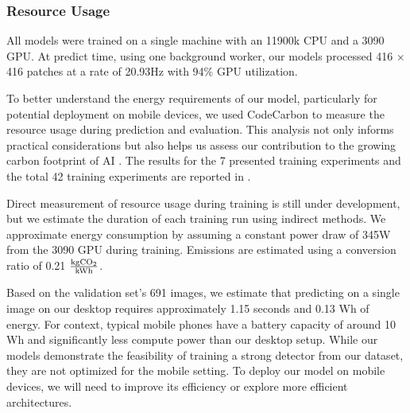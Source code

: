 


\subsubsection{Resource Usage}

All models were trained on a single machine with an 11900k CPU and a 3090 GPU.
At predict time, using one background worker, our models processed 416 $\times$ 416 patches at a rate of
  20.93Hz with 94\% GPU utilization.

To better understand the energy requirements of our model, particularly for potential deployment on mobile
  devices, we used CodeCarbon \cite{lacoste2019codecarbon} to measure the resource usage during prediction and
  evaluation.
This analysis not only informs practical considerations but also helps us assess our contribution to the
  growing carbon footprint of AI \cite{kirkpatrick_carbon_2023}.
The results for the 7 presented training experiments and the total 42 training experiments are reported in
  .

Direct measurement of resource usage during training is still under development, but we estimate the
  duration of each training run using indirect methods.
We approximate energy consumption by assuming a constant power draw of 345W from the 3090 GPU during
  training.
Emissions are estimated using a conversion ratio of 0.21 $\frac{\textrm{kg}\mathrm{CO_2}{}}{\textrm{kWh}}$.
% 
  
Based on the validation set's 691 images, we estimate that predicting on a single image on our desktop
  requires approximately 1.15 seconds and 0.13 Wh of energy.
For context, typical mobile phones have a battery capacity of around 10 Wh and significantly less compute
  power than our desktop setup.
While our models demonstrate the feasibility of training a strong detector from our dataset, they are not
  optimized for the mobile setting.
To deploy our model on mobile devices, we will need to improve its efficiency or explore more efficient
  architectures.
